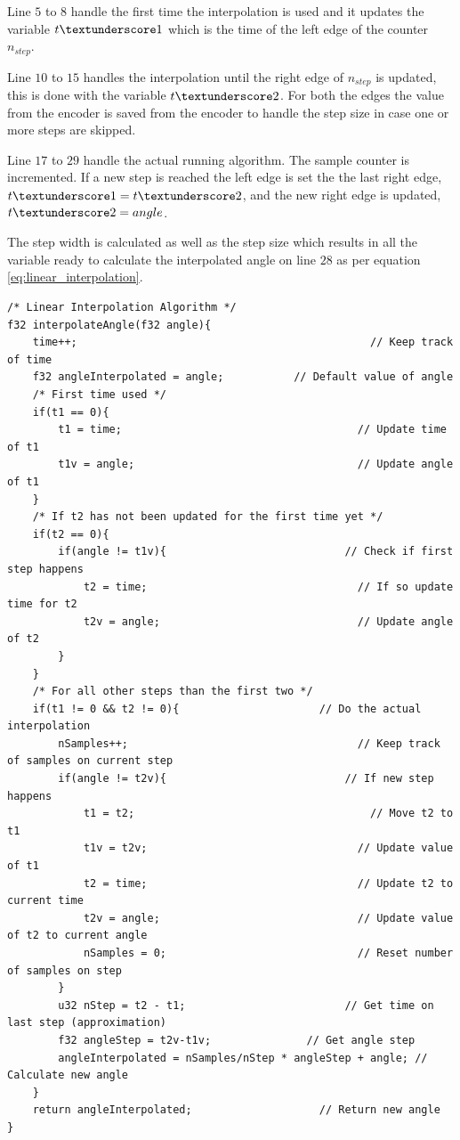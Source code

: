 Line $5$ to $8$ handle the first time the interpolation is used and it updates the variable $t\textunderscore 1$ which is the time of the left edge of the counter $n_{step}$. 

Line $10$ to $15$ handles the interpolation until the right edge of $n_{step}$ is updated, this is done with the variable $t\textunderscore 2$. For both the edges the value from the encoder is saved from the encoder to handle the step size in case one or more steps are skipped.

Line $17$ to $29$ handle the actual running algorithm. The sample counter is incremented. If a new step is reached the left edge is set the the last right edge, $t\textunderscore 1 = t\textunderscore 2$, and the new right edge is updated, $t\textunderscore 2 = angle$.

The step width is calculated as well as the step size which results in all the variable ready to calculate the interpolated angle on line $28$ as per equation \ref{eq:linear_interpolation}.

\begin{lstlisting}[style=c, caption=Interpolation algorithm implemented on the embedded system., label=code:interpolation_algorithm]
/* Linear Interpolation Algorithm */
f32 interpolateAngle(f32 angle){
	time++;								                 // Keep track of time
	f32 angleInterpolated = angle;		     // Default value of angle
	/* First time used */
	if(t1 == 0){
		t1 = time;						               // Update time of t1
		t1v = angle;					               // Update angle of t1
	}
	/* If t2 has not been updated for the first time yet */
	if(t2 == 0){
		if(angle != t1v){				             // Check if first step happens
			t2 = time;					               // If so update time for t2
			t2v = angle;				               // Update angle of t2
		}
	}
	/* For all other steps than the first two */
	if(t1 != 0 && t2 != 0){				         // Do the actual interpolation
		nSamples++;						               // Keep track of samples on current step
		if(angle != t2v){				             // If new step happens
			t1 = t2;					                 // Move t2 to t1
			t1v = t2v;					               // Update value of t1
			t2 = time;					               // Update t2 to current time
			t2v = angle;				               // Update value of t2 to current angle
			nSamples = 0;				               // Reset number of samples on step
		}
 		u32 nStep = t2 - t1;				         // Get time on last step (approximation)
		f32 angleStep = t2v-t1v;	           // Get angle step
		angleInterpolated = nSamples/nStep * angleStep + angle; // Calculate new angle
	}
	return angleInterpolated;			         // Return new angle
}
\end{lstlisting}

